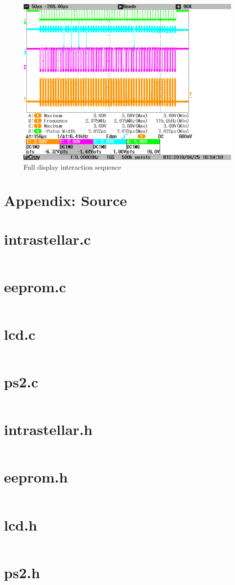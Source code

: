 \documentclass[a4paper, 12pt]{article}
\begin{document}
\begin{figure}[h!]
  \centering
  \includegraphics[scale=.5]{full-display.png}
  \caption{Full display interaction sequence}
  \label{fig:shmatic}
\end{figure}


\clearpage
\section*{Appendix: Source}
\section*{intrastellar.c}
\inputminted{c}{src/intrastellar.c}
\clearpage
\section*{eeprom.c}
\inputminted{c}{src/eeprom.c}
\clearpage
\section*{lcd.c}
\inputminted{c}{src/lcd.c}
\clearpage
\section*{ps2.c}
\inputminted{c}{src/ps2.c}
\clearpage
\section*{intrastellar.h}
\inputminted{c}{inc/intrastellar.h}
\clearpage
\section*{eeprom.h}
\inputminted{c}{inc/eeprom.h}
\clearpage
\section*{lcd.h}
\inputminted{c}{inc/lcd.h}
\clearpage
\section*{ps2.h}
\inputminted{c}{inc/ps2.h}
\end{document}
